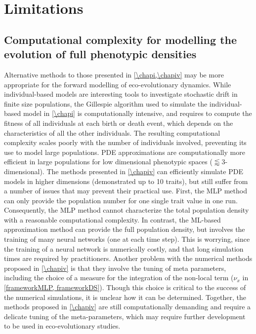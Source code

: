 \section{Limitations}

\subsection{Computational complexity for modelling the evolution of full phenotypic densities}
Alternative methods to those presented in \cref{\chapi,\chapiv} may be more appropriate for the forward modelling of eco-evolutionary dynamics.
% 
While individual-based models are interesting tools to investigate stochastic drift in finite size populations, the Gillespie algorithm \citep{Gillespie1976} used to simulate the individual-based model in \cref{\chapi} is computationally intensive, and requires to compute the fitness of all individuals at each birth or death event, which depends on the characteristics of all the other individuals. The resulting computational complexity scales poorly with the number of individuals involved, preventing its use to model large populations. 
% 
PDE approximations are computationally more efficient in large populations for low dimensional phenotypic spaces ($\lessapprox 3$-dimensional). 
% 
% 
The methods presented in \cref{\chapiv} can efficiently simulate PDE models in higher dimensions (demonstrated up to 10 traits), but still suffer from a number of issues that may prevent their practical use.
% 
First, the MLP method can only provide the population number for one single trait value in one run. Consequently, the MLP method cannot characterize the total population density with a reasonable computational complexity. 
% 
In contrast, the ML-based approximation method can provide the full population density, but involves the training of many neural networks (one at each time step). This is worrying, since the training of a neural network is numerically costly, and that long simulation times are required by practitioners. Another problem with the numerical methods proposed in \cref{\chapiv} is that they involve the tuning of meta parameters, including the choice of a measure for the integration of the non-local term ($\nu_x$ in \cref{frameworkMLP, frameworkDS}). Though this choice is critical to the success of the numerical simulations, it is unclear how it can be determined.
% 
Together, the methods proposed in \cref{\chapiv} are still computationally demanding and require a delicate tuning of the meta-parameters, which may require further development to be used in eco-evolutionary studies. 

